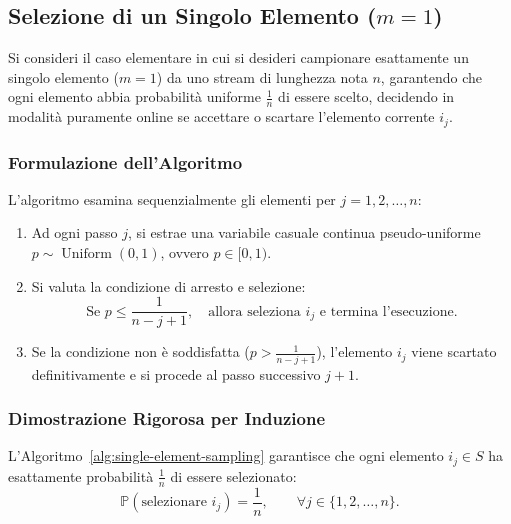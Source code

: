 \FloatBarrier
\subsection{Selezione di un Singolo Elemento (\texorpdfstring{$m = 1$}{m = 1})}
Si consideri il caso elementare in cui si desideri campionare esattamente un singolo elemento ($m = 1$) da uno stream di lunghezza nota $n$, garantendo che ogni elemento abbia probabilità uniforme $\frac{1}{n}$ di essere scelto, decidendo in modalità puramente online se accettare o scartare l'elemento corrente $i_j$.

\subsubsection{Formulazione dell'Algoritmo}
L'algoritmo esamina sequenzialmente gli elementi per $j = 1, 2, \dots, n$:
\begin{enumerate}
  \item Ad ogni passo $j$, si estrae una variabile casuale continua pseudo-uniforme $p \sim \operatorname{Uniform}(0, 1)$, ovvero $p \in [0, 1)$.
  \item Si valuta la condizione di arresto e selezione:
  \begin{equation}
    \text{Se } p \le \frac{1}{n - j + 1}, \quad \text{allora seleziona } i_j \text{ e termina l'esecuzione.}
    \label{eq:single-item-threshold}
  \end{equation}
  \item Se la condizione non è soddisfatta ($p > \frac{1}{n - j + 1}$), l'elemento $i_j$ viene scartato definitivamente e si procede al passo successivo $j+1$.
\end{enumerate}

\begin{algorithm}[H]
  \caption{Campionamento Online di un Singolo Elemento ($m = 1$, $n$ noto)}
  \label{alg:single-element-sampling}
\end{algorithm}

\subsubsection{Dimostrazione Rigorosa per Induzione}
\begin{theorem}
L'Algoritmo~\ref{alg:single-element-sampling} garantisce che ogni elemento $i_j \in S$ ha esattamente probabilità $\frac{1}{n}$ di essere selezionato:
\begin{equation}
  \mathbb{P}(\text{selezionare } i_j) = \frac{1}{n}, \qquad \forall j \in \{1, 2, \dots, n\}.
\end{equation}
\end{theorem}

